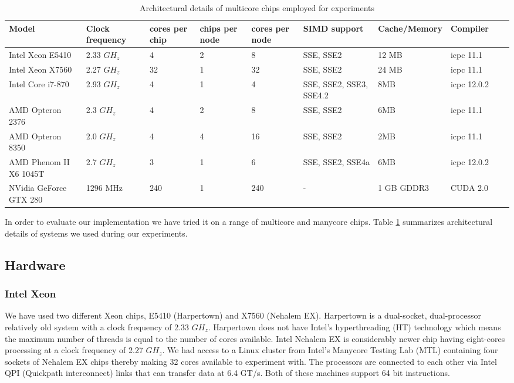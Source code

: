 \documentclass{IEEEtran}
\begin{document}
\begin{table}[t]
\begin{tabular}{|l|p{1.2cm}|p{0.8cm}|p{0.8cm}|p{0.8cm}|p{3.5cm}|l|p{2cm}|l|p{0.9cm}|}
\hline 
\textbf{Model}  & \textbf{Clock frequency}  & \textbf{cores per chip}  & \textbf{chips per node}  & \textbf{cores per node}  & \textbf{SIMD support}  & \textbf{Cache/Memory}  & Compiler\\
\hline 
Intel Xeon E5410  & 2.33 $GH_z$  & 4  & 2  & 8  & SSE, SSE2  & 12 MB  & icpc 11.1\\
\hline 
Intel Xeon X7560  & 2.27 $GH_z$  & 32  & 1  & 32  & SSE, SSE2  & 24 MB & icpc 11.1\\
\hline 
Intel Core i7-870  & 2.93 $GH_z$  & 4  & 1  & 4  & SSE, SSE2, SSE3, SSE4.2  & 8MB & icpc 12.0.2\\
\hline 
AMD Opteron 2376  & 2.3 $GH_z$  & 4  & 2  & 8  & SSE, SSE2  & 6MB  & icpc 11.1\\
\hline 
AMD Opteron 8350  & 2.0 $GH_z$  & 4  & 4  & 16  & SSE, SSE2  & 2MB  & icpc 11.1 \\
\hline 
AMD Phenom II X6 1045T  & 2.7 $GH_z$  & 3  & 1  & 6  & SSE, SSE2, SSE4a  & 6MB  & icpc 12.0.2 \\
\hline 
NVidia GeForce GTX 280 & 1296 MHz & 240 & 1 & 240 & - & 1 GB GDDR3 & CUDA 2.0\\
\hline
\end{tabular}\caption{Architectural details of multicore chips employed for experiments}
\label{tab:archs} 
\end{table}

In order to evaluate our implementation we have tried it on a range of multicore and manycore chips. Table \ref{tab:archs} summarizes architectural details of systems we used during our experiments. 


\subsection{Hardware}
\label{subsec:hw} 
\subsubsection{Intel Xeon}
\label{ss:xeon} We have used two different Xeon chips, E5410 (Harpertown) and X7560 (Nehalem EX). Harpertown is a dual-socket, dual-processor relatively old system with a clock frequency of 2.33 $GH_z$.  Harpertown does not have Intel's hyperthreading (HT) technology which means the maximum number of threads is equal to the number of cores available. Intel Nehalem EX is considerably newer chip having eight-cores processing at a clock frequency of 2.27 $GH_z$. We had access to a Linux cluster from Intel's Manycore Testing Lab (MTL) containing four sockets of Nehalem EX chips thereby making 32 cores available to experiment with. The processors are connected to each other via Intel QPI (Quickpath interconnect) links that can transfer data at 6.4 GT/s. Both of these machines support 64 bit instructions. 
\end{document}
